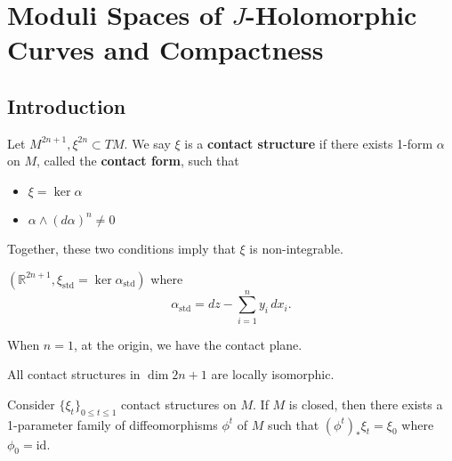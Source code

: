 \chapter{Moduli Spaces of $J$-Holomorphic Curves and Compactness}
\label{b1}

\section{Introduction}

\begin{definition}

Let $M^{2n+1}, \xi^{2n}\subset TM$. We say $\xi$ is a \textbf{contact structure} if there exists 1-form $\alpha$ on $M$, called the \textbf{contact form}, such that
\begin{itemize}
\item $\xi = \ker \alpha$
\item $\alpha \wedge (d\alpha)^n \neq 0$
\end{itemize}

\end{definition}

Together, these two conditions imply that $\xi$ is non-integrable.

\begin{example}

$(\mathbb{R}^{2n+1}, \xi_{\text{std}}=\ker \alpha_{\text{std}})$ where
\[
\alpha_{\text{std}}= dz-\sum_{i=1}^n y_i \,dx_i.
\]

When $n=1$, at the origin, we have the contact plane.

\end{example}

\begin{theorem}

All contact structures in $\dim 2n+1$ are locally isomorphic.

\end{theorem}

\begin{theorem}

Consider $\{\xi_t \}_{0\le t \le 1}$ contact structures on $M$. If $M$ is closed, then there exists a 1-parameter family of diffeomorphisms $\phi^t$ of $M$ such that $(\phi^t)_* \xi_t = \xi_0$ where $\phi_0 =\text{id}$.

\end{theorem}

